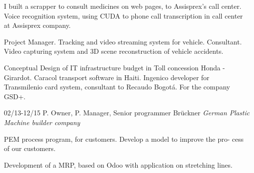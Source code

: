 \begin{entrylist}
{I built a scrapper to consult medicines on web pages, to Assisprex’s call center. Voice recognition system, using CUDA to phone call transcription in call center at Assisprex company.

Project Manager. Tracking and video streaming system for vehicle. Consultant. Video capturing system and 3D scene reconstruction of vehicle accidents.

Conceptual Design of IT infrastructure budget in Toll concession Honda - Girardot. Caracol transport software in Haiti. Ingenico developer for Transmilenio card system, consultant to Recaudo Bogotá. For the company GSD+.}

  \entry
	{02/13-12/15}
	{P. Owner, P. Manager, Senior programmer}
	{Brückner {\sl German Plastic Machine builder company}}
	{PEM process program, for customers. Develop a model to improve the pro-
cess of our customers.

	Development of a MRP, based on Odoo with application on stretching lines.}
\end{entrylist}

\newpage

